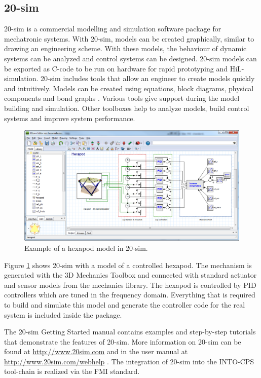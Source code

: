 \subsection{20-sim}
{20-sim} \cite{20sim,Broenink97} is a commercial modelling and simulation software package for mechatronic systems.
%
With {20-sim}, models can be created graphically, similar to drawing an engineering scheme.
%
With these models, the behaviour of dynamic systems can be analyzed and control systems can be designed.
%
{20-sim} models can be exported as C-code to be run on hardware for rapid prototyping and HiL-simulation.
%
{20-sim} includes tools that allow an engineer to create models quickly and intuitively.
%
Models can be created using equations, block diagrams, physical components and bond graphs \cite{Karnopp&68}.
%
Various tools give support during the model building and simulation.
%
Other toolboxes help to analyze models, build control systems and improve system performance.
%
%
%
\begin{figure}[hpt!]
	\centerline{\includegraphics[width=\textwidth]{figures/20-sim_hexapod_model.png}}
	\caption{Example of a hexapod model in 20-sim.}
	\label{figure:20sim_hexapod_example}
\end{figure}
%
%
%
Figure \ref{figure:20sim_hexapod_example} shows {20-sim} with a model of a controlled hexapod.
%
The mechanism is generated with the 3D Mechanics Toolbox and connected with standard actuator and sensor models from the mechanics library.
%
The hexapod is controlled by PID controllers which are tuned in the frequency domain.
%
Everything that is required to build and simulate this model and generate the controller code for the real system is included inside the package.

The {20-sim} Getting Started manual \cite{20simGettingStarted16} contains examples and step-by-step tutorials that demonstrate the features of {20-sim}.
%
More information on {20-sim} can be found at \url{http://www.20sim.com} and in the user manual at \url{http://www.20sim.com/webhelp} \cite{20simReference16a}.
%
The integration of {20-sim} into the INTO-CPS tool-chain is realized via the FMI standard.
%
%
%
